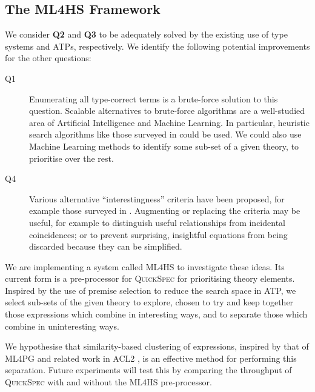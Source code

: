 \documentclass[]{article}
\begin{document}
\subsection{The \textsc{ML4HS} Framework}\label{ml4hs}

We consider \textbf{Q2} and \textbf{Q3} to be adequately solved by the existing
use of type systems and ATPs, respectively. We identify the following potential
improvements for the other questions:

\begin{description}
\item [Q1]
  Enumerating all type-correct terms is a brute-force solution to this question.
  Scalable alternatives to brute-force algorithms are a well-studied area of
  Artificial Intelligence and Machine Learning. In particular, heuristic
  search algorithms like those surveyed in \cite{blum2011hybrid} could be used.
  We could also use Machine Learning methods to identify some sub-set of a given
  theory, to prioritise over the rest.
\item [Q4]
  Various alternative ``interestingness'' criteria have been proposed, for
  example those surveyed in \cite{geng2006interestingness}. Augmenting or
  replacing the criteria may be useful, for example to distinguish useful
  relationships from incidental coincidences; or to prevent surprising,
  insightful equations from being discarded because they can be simplified.
\end{description}

We are implementing a system called \textsc{ML4HS} to investigate these ideas.
Its current form is a pre-processor for \textsc{QuickSpec} for prioritising
theory elements. Inspired by the use of premise selection
\cite{kuhlwein2012overview} to reduce the search space in ATP,
we select sub-sets of the given theory to explore, chosen to try and keep
together those expressions which combine in interesting ways, and to separate
those which combine in uninteresting ways.

We hypothesise that similarity-based clustering of expressions, inspired by that
of \textsc{ML4PG} \cite{journals/corr/abs-1212-3618} and related work in ACL2
\cite{heras2013proof}, is an effective method for performing this separation.
Future experiments will test this by comparing the throughput of
\textsc{QuickSpec} with and without the \textsc{ML4HS} pre-processor.


\end{document}
